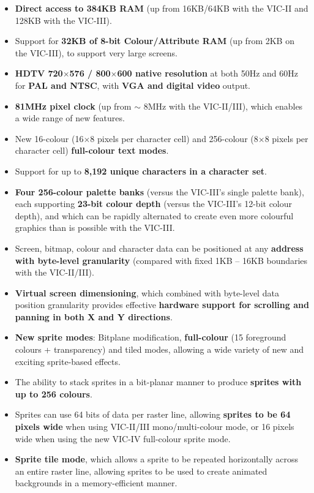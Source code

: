 \begin{itemize}
\item {\bf Direct access to 384KB RAM} (up from 16KB/64KB with the VIC-II and 128KB
  with the VIC-III).
\item Support for {\bf 32KB of 8-bit Colour/Attribute RAM} (up from 2KB on the VIC-III), to
  support very large screens.
\item {\bf HDTV 720$\times$576 / 800$\times$600 native resolution} at both 50Hz and 60Hz for {\bf PAL and NTSC}, with {\bf VGA and digital video} output.
\item {\bf 81MHz pixel clock} (up from $\sim$ 8MHz with the VIC-II/III), which enables a wide range of new features.
\item New 16-colour (16$\times$8 pixels per character cell) and 256-colour (8$\times$8 pixels per character cell) {\bf full-colour text modes}.
\item Support for up to {\bf 8,192 unique characters in a character set}.
\item {\bf Four 256-colour palette banks} (versus the VIC-III's single palette bank), each supporting {\bf 23-bit colour depth} (versus the VIC-III's 12-bit colour depth), and which can be rapidly alternated to create even more colourful graphics than is possible with the VIC-III.
\item Screen, bitmap, colour and character data can be positioned at any {\bf address with byte-level granularity} (compared with fixed 1KB -- 16KB boundaries with the VIC-II/III).
\item {\bf Virtual screen dimensioning}, which combined with byte-level data position granularity provides effective {\bf hardware support for scrolling and panning in both X and Y directions}.
\item {\bf New sprite modes}: Bitplane modification, {\bf full-colour} (15 foreground colours + transparency) and tiled modes, allowing a wide variety of new and exciting sprite-based effects.
\item The ability to stack sprites in a bit-planar manner to produce {\bf sprites with up to 256 colours}.
\item Sprites can use 64 bits of data per raster line, allowing {\bf sprites to be 64 pixels wide} when using VIC-II/III mono/multi-colour mode, or 16 pixels wide when using the new VIC-IV full-colour sprite mode.
\item {\bf Sprite tile mode}, which allows a sprite to be repeated horizontally across an entire raster line, allowing sprites to be used to create  animated backgrounds in a memory-efficient manner.

\end{itemize}
